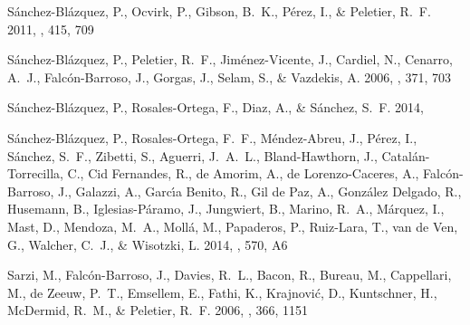\begin{thebibliography}
{S{\'a}nchez-Bl{\'a}zquez}, P., {Ocvirk}, P., {Gibson}, B.~K., {P{\'e}rez}, I.,
  \& {Peletier}, R.~F. 2011, \mnras, 415, 709


{S{\'a}nchez-Bl{\'a}zquez}, P., {Peletier}, R.~F., {Jim{\'e}nez-Vicente}, J.,
  {Cardiel}, N., {Cenarro}, A.~J., {Falc{\'o}n-Barroso}, J., {Gorgas}, J.,
  {Selam}, S., \& {Vazdekis}, A. 2006, \mnras, 371, 703


{S{\'a}nchez-Bl{\'a}zquez}, P., {Rosales-Ortega}, F., {Diaz}, A., \&
  {S{\'a}nchez}, S.~F. 2014{}, \mnras


{S{\'a}nchez-Bl{\'a}zquez}, P., {Rosales-Ortega}, F.~F., {M{\'e}ndez-Abreu},
  J., {P{\'e}rez}, I., {S{\'a}nchez}, S.~F., {Zibetti}, S., {Aguerri},
  J.~A.~L., {Bland-Hawthorn}, J., {Catal{\'a}n-Torrecilla}, C., {Cid
  Fernandes}, R., {de Amorim}, A., {de Lorenzo-Caceres}, A.,
  {Falc{\'o}n-Barroso}, J., {Galazzi}, A., {Garc{\'{\i}}a Benito}, R., {Gil de
  Paz}, A., {Gonz{\'a}lez Delgado}, R., {Husemann}, B., {Iglesias-P{\'a}ramo},
  J., {Jungwiert}, B., {Marino}, R.~A., {M{\'a}rquez}, I., {Mast}, D.,
  {Mendoza}, M.~A., {Moll{\'a}}, M., {Papaderos}, P., {Ruiz-Lara}, T., {van de
  Ven}, G., {Walcher}, C.~J., \& {Wisotzki}, L. 2014{}, \aap, 570,
  A6


{Sarzi}, M., {Falc{\'o}n-Barroso}, J., {Davies}, R.~L., {Bacon}, R., {Bureau},
  M., {Cappellari}, M., {de Zeeuw}, P.~T., {Emsellem}, E., {Fathi}, K.,
  {Krajnovi{\'c}}, D., {Kuntschner}, H., {McDermid}, R.~M., \& {Peletier},
  R.~F. 2006{}, \mnras, 366, 1151



\end{thebibliography}
